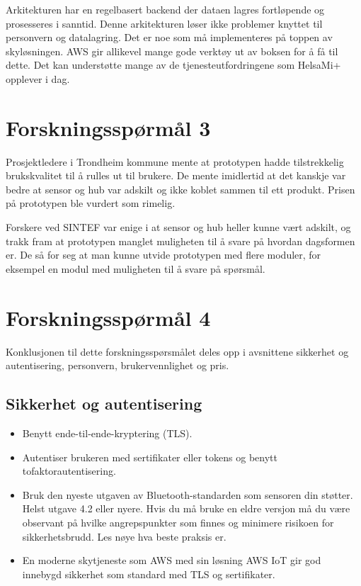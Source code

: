 Arkitekturen har en regelbasert backend der dataen lagres fortløpende og
prosesseres i sanntid. Denne arkitekturen løser ikke problemer knyttet til personvern
og datalagring. Det er noe som må implementeres på toppen av skyløsningen. AWS gir allikevel
mange gode verktøy ut av boksen for å få til dette. Det kan understøtte mange av de
tjenesteutfordringene som HelsaMi+ opplever i dag.

\section{Forskningsspørmål 3}
\textbf{}

Prosjektledere i Trondheim kommune mente at prototypen hadde tilstrekkelig
brukskvalitet til å rulles ut til brukere. De mente imidlertid at det kanskje var bedre at
sensor og hub var adskilt og ikke koblet sammen til ett produkt. Prisen på prototypen
ble vurdert som rimelig.

Forskere ved SINTEF var enige i at sensor og hub heller kunne vært adskilt, og trakk
fram at prototypen manglet muligheten til å svare på hvordan
dagsformen er. De så for seg at man kunne utvide prototypen med flere moduler,
for eksempel en modul med muligheten til å svare på spørsmål.

\section{Forskningsspørmål 4}
\textbf{}

Konklusjonen til dette forskningsspørsmålet deles opp
i avsnittene sikkerhet og autentisering, personvern, brukervennlighet og
pris.

\subsection{Sikkerhet og autentisering}
\begin{itemize}
  \item Benytt ende-til-ende-kryptering (TLS).
  \item Autentiser brukeren med sertifikater eller tokens og benytt tofaktorautentisering.
  \item Bruk den nyeste utgaven av Bluetooth-standarden som sensoren din
  støtter. Helst utgave 4.2 eller nyere. Hvis du må bruke en eldre versjon må
  du være observant på hvilke angrepspunkter som finnes og minimere risikoen for
  sikkerhetsbrudd. Les nøye hva beste praksis er.
  \item En moderne skytjeneste som AWS med sin løsning AWS IoT gir
      god innebygd sikkerhet som standard med TLS og sertifikater.
\end{itemize}

